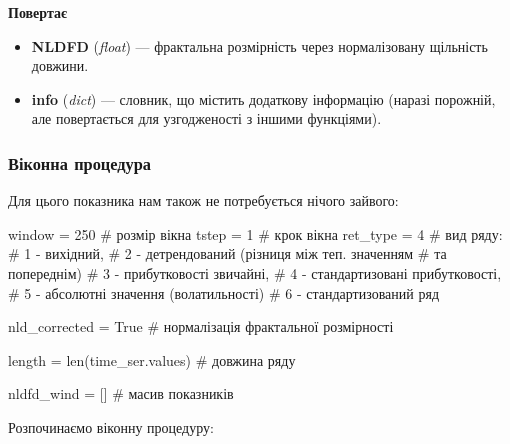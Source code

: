 \documentclass[
  letterpaper,
]{report}
\newenvironment{Shaded}{\begin{snugshade}}{\end{snugshade}}
\newcommand{\BuiltInTok}[1]{\textcolor[rgb]{0.00,0.23,0.31}{#1}}
\newcommand{\CommentTok}[1]{\textcolor[rgb]{0.37,0.37,0.37}{#1}}
\newcommand{\DecValTok}[1]{\textcolor[rgb]{0.68,0.00,0.00}{#1}}
\newcommand{\NormalTok}[1]{\textcolor[rgb]{0.00,0.23,0.31}{#1}}
\newcommand{\OperatorTok}[1]{\textcolor[rgb]{0.37,0.37,0.37}{#1}}
\newcommand{\VariableTok}[1]{\textcolor[rgb]{0.07,0.07,0.07}{#1}}
\providecommand{\tightlist}{%
  \setlength{\itemsep}{0pt}\setlength{\parskip}{0pt}}\usepackage{longtable,booktabs,array}
\begin{document}
\textbf{Повертає}

\begin{itemize}
\tightlist
\item
  \textbf{NLDFD} (\emph{float}) --- фрактальна розмірність через
  нормалізовану щільність довжини.
\item
  \textbf{info} (\emph{dict}) --- словник, що містить додаткову
  інформацію (наразі порожній, але повертається для узгодженості з
  іншими функціями).
\end{itemize}

\hypertarget{ux432ux456ux43aux43eux43dux43dux430-ux43fux440ux43eux446ux435ux434ux443ux440ux430-7}{%
\subsubsection{Віконна
процедура}\label{ux432ux456ux43aux43eux43dux43dux430-ux43fux440ux43eux446ux435ux434ux443ux440ux430-7}}

Для цього показника нам також не потребується нічого зайвого:

\begin{Shaded}
\begin{Highlighting}[]
\NormalTok{window }\OperatorTok{=} \DecValTok{250}    \CommentTok{\# розмір вікна}
\NormalTok{tstep }\OperatorTok{=} \DecValTok{1}       \CommentTok{\# крок вікна}
\NormalTok{ret\_type }\OperatorTok{=} \DecValTok{4}    \CommentTok{\# вид ряду: }
                \CommentTok{\# 1 {-} вихідний, }
                \CommentTok{\# 2 {-} детрендований (різниця між теп. значенням }
                                                \CommentTok{\# та попереднім)}
                \CommentTok{\# 3 {-} прибутковості звичайні, }
                \CommentTok{\# 4 {-} стандартизовані прибутковості, }
                \CommentTok{\# 5 {-} абсолютні значення (волатильності)}
                \CommentTok{\# 6 {-} стандартизований ряд}

\NormalTok{nld\_corrected }\OperatorTok{=} \VariableTok{True}               \CommentTok{\# нормалізація фрактальної розмірності}

\NormalTok{length }\OperatorTok{=} \BuiltInTok{len}\NormalTok{(time\_ser.values)      }\CommentTok{\# довжина ряду}

\NormalTok{nldfd\_wind }\OperatorTok{=}\NormalTok{ []                    }\CommentTok{\# масив показників }
\end{Highlighting}
\end{Shaded}

Розпочинаємо віконну процедуру:
\end{document}
